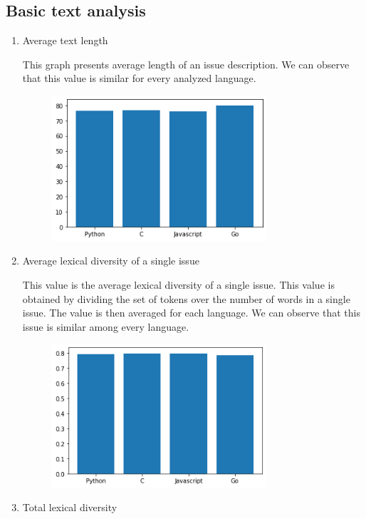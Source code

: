 \documentclass[]{article}
\begin{document}
\subsection{Basic text analysis}
\begin{enumerate}
    \item Average text length
    
    This graph presents average length of an issue description. We can observe that this value is similar for every analyzed language.
    
    
    \begin{figure}[H]
    \includegraphics[width=8cm]{resources/avg_len.png}
    \centering
    \end{figure}
    
    \item Average lexical diversity of a single issue
    
    This value is the average lexical diversity of a single issue. This value is obtained by dividing the set of tokens over the number of words in a single issue. The value is then averaged for each language. We can observe that this issue is similar among every language.
    
        \begin{figure}[H]
    \includegraphics[width=8cm]{resources/lex_div_single.png}
    \centering
    \end{figure}
    
    \item Total lexical diversity
    

\end{enumerate}
\end{document}
